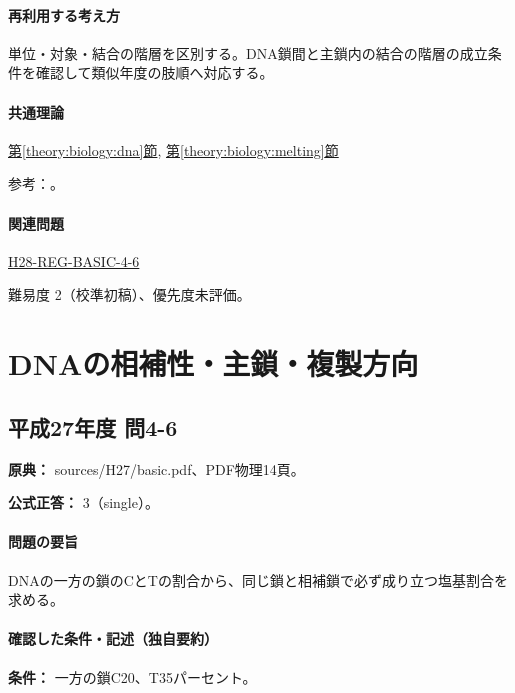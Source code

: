 \paragraph{再利用する考え方} 単位・対象・結合の階層を区別する。DNA鎖間と主鎖内の結合の階層の成立条件を確認して類似年度の肢順へ対応する。

\paragraph{共通理論} \hyperref[theory:biology:dna]{第\ref*{theory:biology:dna}節}, \hyperref[theory:biology:melting]{第\ref*{theory:biology:melting}節}

\par 参考：\cite{bu_dna_melting,nhgri_dna}。

\paragraph{関連問題} \hyperref[q:h28-reg-basic-4-6]{H28-REG-BASIC-4-6}

\par 難易度 2（校準初稿）、優先度未評価。

\section{DNAの相補性・主鎖・複製方向}

\subsection{平成27年度 問4-6}
\label{q:h27-reg-basic-4-6}

\noindent\textbf{原典：} sources/H27/basic.pdf、PDF物理14頁。

\textbf{公式正答：} 3（single）。

\paragraph{問題の要旨} DNAの一方の鎖のCとTの割合から、同じ鎖と相補鎖で必ず成り立つ塩基割合を求める。

\paragraph{確認した条件・記述（独自要約）}\mbox{}\par

\noindent\textbf{条件：} 一方の鎖C20、T35パーセント。\par

